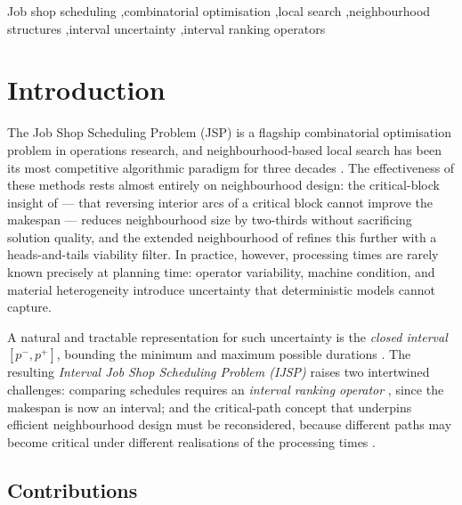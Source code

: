 \documentclass[preprint,12pt]{elsarticle}
\begin{document}
\begin{frontmatter}
\begin{keyword}
Job shop scheduling \sep combinatorial optimisation \sep local search \sep neighbourhood structures \sep interval uncertainty \sep interval ranking operators
\end{keyword}

\end{frontmatter}


\section{Introduction}
\label{sec1}

The Job Shop Scheduling Problem (JSP) is a flagship combinatorial optimisation problem in operations research, and neighbourhood-based local search has been its most competitive algorithmic paradigm for three decades \cite{vanLaarhoven1992,Nowicki1996,Nowicki2005}. The effectiveness of these methods rests almost entirely on neighbourhood design: the critical-block insight of \cite{Nowicki1996} --- that reversing interior arcs of a critical block cannot improve the makespan --- reduces neighbourhood size by two-thirds without sacrificing solution quality, and the extended neighbourhood of \cite{Nowicki2005} refines this further with a heads-and-tails viability filter. In practice, however, processing times are rarely known precisely at planning time: operator variability, machine condition, and material heterogeneity introduce uncertainty that deterministic models cannot capture.

A natural and tractable representation for such uncertainty is the \emph{closed interval} $[p^-, p^+]$, bounding the minimum and maximum possible durations \cite{Moore2009,Lei2012c}. The resulting \emph{Interval Job Shop Scheduling Problem (IJSP)} raises two intertwined challenges: comparing schedules requires an \emph{interval ranking operator} \cite{Bustince2013,Karmakar2012}, since the makespan is now an interval; and the critical-path concept that underpins efficient neighbourhood design must be reconsidered, because different paths may become critical under different realisations of the processing times \cite{Dubois2003,Artigues2015,GonzalezRodriguez2008}.

\subsection{Contributions}
\label{sec1.1}
\end{document}
